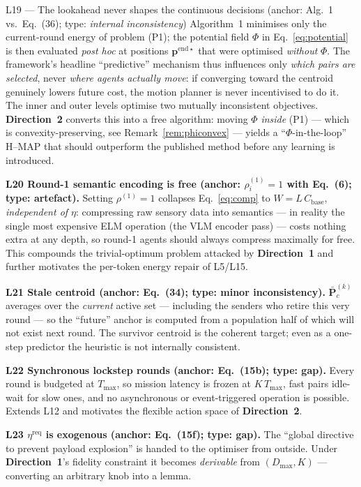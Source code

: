 \documentclass[11pt,a4paper]{article}
\newcommand{\Ltag}[1]{\textcolor{brick}{\textbf{#1}}}
\newcommand{\Dir}[1]{\textcolor{accent}{\textbf{Direction~#1}}}
\begin{document}
\begin{limitbox}{L19 --- The lookahead never shapes the continuous decisions (anchor: Alg.~1 vs.\ Eq.~(36); type: \emph{internal inconsistency})}
Algorithm~1 minimises only the current-round energy of problem (P1); the potential field $\Phi$ in Eq.~\eqref{eq:potential} is then evaluated \emph{post hoc} at positions $\mathbf p^{\mathrm{end}\star}$ that were optimised \emph{without} $\Phi$. The framework's headline ``predictive'' mechanism thus influences only \emph{which pairs are selected}, never \emph{where agents actually move}: if converging toward the centroid genuinely lowers future cost, the motion planner is never incentivised to do it. The inner and outer levels optimise two mutually inconsistent objectives. \Dir{2} converts this into a free algorithm: moving $\Phi$ \emph{inside} (P1) --- which is convexity-preserving, see Remark~\ref{rem:phiconvex} --- yields a ``$\Phi$-in-the-loop'' H--MAP that should outperform the published method before any learning is introduced.
\end{limitbox}

\textbf{\Ltag{L20} Round-1 semantic encoding is free (anchor: $\rho^{(1)}_i{=}1$ with Eq.~(6); type: artefact).} Setting $\rho^{(1)}=1$ collapses Eq.~\eqref{eq:comp} to $W=L\,C_{\mathrm{base}}$, \emph{independent of $\eta$}: compressing raw sensory data into semantics --- in reality the single most expensive ELM operation (the VLM encoder pass) --- costs nothing extra at any depth, so round-1 agents should always compress maximally for free. This compounds the trivial-optimum problem attacked by \Dir{1} and further motivates the per-token energy repair of L5/L15.

\textbf{\Ltag{L21} Stale centroid (anchor: Eq.~(34); type: minor inconsistency).} $\bar{\mathbf P}_c^{(k)}$ averages over the \emph{current} active set --- including the senders who retire this very round --- so the ``future'' anchor is computed from a population half of which will not exist next round. The survivor centroid is the coherent target; even as a one-step predictor the heuristic is not internally consistent.

\textbf{\Ltag{L22} Synchronous lockstep rounds (anchor: Eq.~(15b); type: gap).} Every round is budgeted at $T_{\max}$, so mission latency is frozen at $K\,T_{\max}$, fast pairs idle-wait for slow ones, and no asynchronous or event-triggered operation is possible. Extends L12 and motivates the flexible action space of \Dir{2}.

\textbf{\Ltag{L23} $\eta^{\mathrm{req}}$ is exogenous (anchor: Eq.~(15f); type: gap).} The ``global directive to prevent payload explosion'' is handed to the optimiser from outside. Under \Dir{1}'s fidelity constraint it becomes \emph{derivable} from $(D_{\max},K)$ --- converting an arbitrary knob into a lemma.
\end{document}
